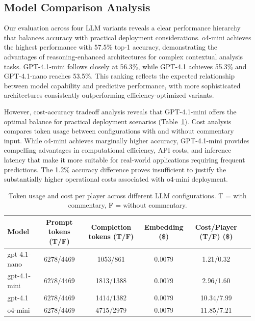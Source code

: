 \documentclass[sigconf,anonymous,review]{acmart}
\begin{document}
\subsection{Model Comparison Analysis}

Our evaluation across four LLM variants reveals a clear performance hierarchy that balances accuracy with practical deployment considerations. o4-mini achieves the highest performance with 57.5\% top-1 accuracy, demonstrating the advantages of reasoning-enhanced architectures for complex contextual analysis tasks. GPT-4.1-mini follows closely at 56.3\%, while GPT-4.1 achieves 55.3\% and GPT-4.1-nano reaches 53.5\%. This ranking reflects the expected relationship between model capability and predictive performance, with more sophisticated architectures consistently outperforming efficiency-optimized variants.

However, cost-accuracy tradeoff analysis reveals that GPT-4.1-mini offers the optimal balance for practical deployment scenarios (Table~\ref{tab:cost-comparison}). Cost analysis compares token usage between configurations with and without commentary input. While o4-mini achieves marginally higher accuracy, GPT-4.1-mini provides compelling advantages in computational efficiency, API costs, and inference latency that make it more suitable for real-world applications requiring frequent predictions. The 1.2\% accuracy difference proves insufficient to justify the substantially higher operational costs associated with o4-mini deployment.  

\begin{table}[t]
  \centering
  \small
  \renewcommand{\arraystretch}{1.5}
  \begin{tabular}{lccccc}
    \toprule
    Model        & Prompt tokens (T/F) & Completion tokens (T/F) & Embedding (\$) & Cost/Player (T/F) (\$)  \\
    \midrule
    gpt-4.1-nano & 6278/4469           & 1053/861                & 0.0079         & 1.21/0.32                    \\
    gpt-4.1-mini & 6278/4469           & 1813/1388               & 0.0079         & 2.96/1.60                    \\
    gpt-4.1      & 6278/4469           & 1414/1382               & 0.0079         & 10.34/7.99                   \\
    o4-mini      & 6278/4469           & 4715/2979               & 0.0079         & 11.85/7.21                   \\
    \bottomrule
  \end{tabular}
  \vspace{0.5em}
  \caption{Token usage and cost per player across different LLM configurations. T = with commentary, F = without commentary.}
  \label{tab:cost-comparison}
\end{table}
\end{document}
